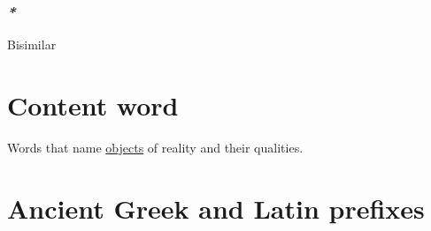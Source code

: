 \documentclass[a4paper,14pt,oneside]{book}
\begin{document}
\subsubsection{\emph{*}}
\label{sec:org047e224}

\label{org599394e}Bisimilar

\section{\label{orgfbc664b}Content word}
\label{sec:org22be1b3}
Words that name \hyperref[orgee8cdbc]{objects} of reality and their qualities.

\section{Ancient Greek and Latin prefixes}
\label{sec:orgadbb821}
\end{document}
